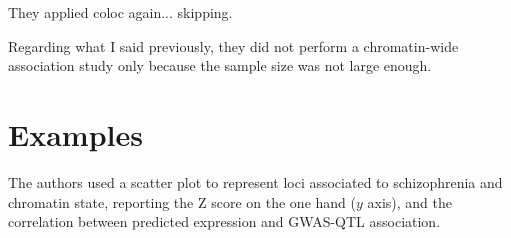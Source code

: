 \documentclass[../main.tex]{subfiles}
\begin{document}
They applied coloc again... skipping.

Regarding what I said previously, they did not perform a chromatin-wide 
association study only because the sample size was not large enough.

\section{Examples}

The authors used a scatter plot to represent loci associated to 
schizophrenia and chromatin state, reporting the Z score on the one hand 
($y$ axis), and the correlation between predicted expression and 
GWAS-QTL association. 
\end{document}
